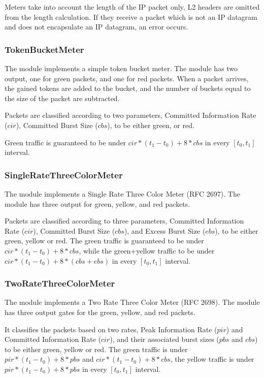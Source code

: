 \begin{important}
Meters take into account the length of the IP packet only, L2 headers are omitted
from the length calculation. If they receive a packet which is not
an IP datagram and does not encapsulate an IP datagram, an error occurs.
\end{important}

\subsubsection*{TokenBucketMeter}

The  module implements a simple token bucket meter.
The module has two output, one for green packets, and one for red packets.
When a packet arrives, the gained tokens are added to the bucket, and
the number of buckets equal to the size of the packet are subtracted.

Packets are classified according to two parameters,
Committed Information Rate ($cir$), Committed Burst Size ($cbs$),
to be either green, or red.

Green traffic is guaranteed to be under $cir*(t_1-t_0)+8*cbs$ in
every $[t_0,t_1]$ interval.

\subsubsection*{SingleRateThreeColorMeter}

The  module implements a
Single Rate Three Color Meter (RFC 2697).
The module has three output for green, yellow, and red packets.

Packets are classified according to three parameters,
Committed Information Rate ($cir$), Committed Burst Size ($cbs$),
and Excess Burst Size ($ebs$), to be either green, yellow or red.
The green traffic is guaranteed to be under $cir*(t_1-t_0)+8*cbs$,
while the green+yellow traffic to be under $cir*(t_1-t_0)+8*(cbs+ebs)$
in every $[t_0,t_1]$ interval.


\subsubsection*{TwoRateThreeColorMeter}

The  module implements a
Two Rate Three Color Meter (RFC 2698). The module has three output
gates for the green, yellow, and red packets.

It classifies the packets based on two rates, Peak Information Rate ($pir$)
and Committed Information Rate ($cir$), and their associated burst sizes
($pbs$ and $cbs$) to be either green, yellow or red. The green traffic
is under $pir*(t_1-t_0)+8*pbs$ and $cir*(t_1-t_0)+8*cbs$, the yellow traffic
is under $pir*(t_1-t_0)+8*pbs$ in every $[t_0,t_1]$ interval.

